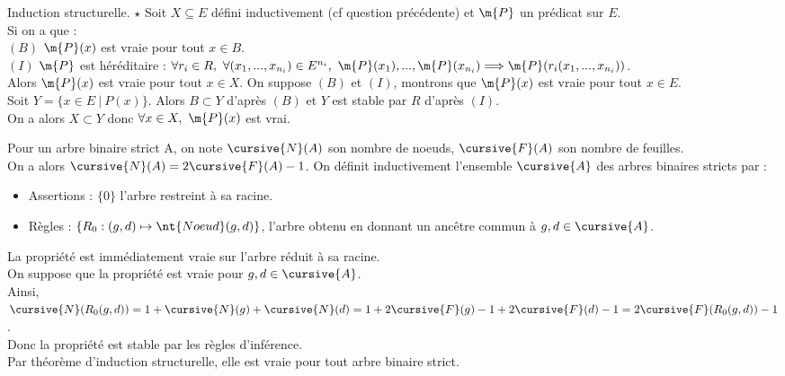 \documentclass[french, 11pt]{article}
\begin{document}
\begin{thm}{Induction structurelle. $\star$}{}
    Soit $X\subseteq E$ défini inductivement (cf question précédente) et $\m{P}$ un prédicat sur $E$.\\
    Si on a que :\\
    \hspace*{2em}$(B)$ $\m{P}(x)$ est vraie pour tout $x\in B$.\\
    \hspace*{2em}$(I)$ $\m{P}$ est héréditaire : $\forall r_i\in R, ~ \forall (x_1,...,x_{n_i})\in E^{n_i}, ~ \m{P}(x_1),...,\m{P}(x_{n_i})\Longrightarrow \m{P}(r_i(x_1, ..., x_{n_i}))$.\\
    Alors $\m{P}(x)$ est vraie pour tout $x\in X$.
    \tcblower
    On suppose $(B)$ et $(I)$, montrons que $\m{P}(x)$ est vraie pour tout $x\in E$.\\
    Soit $Y = \{x\in E ~ | ~ P(x)\}$. Alors $B \subset Y$ d'après $(B)$ et $Y$ est stable par $R$ d'après $(I)$.\\
    On a alors $X \subset Y$ donc $\forall x \in X, ~ \m{P}(x)$ est vrai.
\end{thm}

\begin{ex}{}{}
    Pour un arbre binaire strict A, on note $\cursive{N}(A)$ son nombre de noeuds, $\cursive{F}(A)$ son nombre de feuilles.\\
    On a alors $\cursive{N}(A)=2\cursive{F}(A)-1$.
    \tcblower
    On définit inductivement l'ensemble $\cursive{A}$ des arbres binaires stricts par :
    \begin{itemize}[topsep=0pt,itemsep=-0.9 ex]
        \item Assertions : $\{0\}$ l'arbre restreint à sa racine.
        \item Règles : $\{R_0:(g,d) \mapsto \nt{Noeud}(g,d)\}$, l'arbre obtenu en donnant un ancêtre commun à $g,d\in\cursive{A}$.
    \end{itemize}
    La propriété est immédiatement vraie sur l'arbre réduit à sa racine.\\
    On suppose que la propriété est vraie pour $g,d\in\cursive{A}$.\\
    Ainsi, $\cursive{N}(R_0(g,d))=1+\cursive{N}(g)+\cursive{N}(d)=1+2\cursive{F}(g)-1+2\cursive{F}(d)-1=2\cursive{F}(R_0(g,d))-1$.\\
    Donc la propriété est stable par les règles d'inférence.\\
    Par théorème d'induction structurelle, elle est vraie pour tout arbre binaire strict.
\end{ex}
\end{document}
